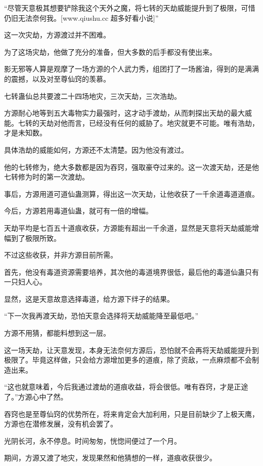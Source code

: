
\begin{this_body}

“尽管天意极其想要铲除我这个天外之魔，将七转的天劫威能提升到了极限，可惜仍旧无法奈何我。[www.qiushu.cc 超多好看小说]”

这一次灾劫，方源渡过并不困难。

为了这场灾劫，他做了充分的准备，但大多数的后手都没有使出来。

影无邪等人算是观摩了一场方源的个人武力秀，组团打了一场酱油，得到的是满满的震撼，以及对至尊仙窍的羡慕。

七转蛊仙总共要渡二十四场地灾，三次天劫，三次浩劫。

方源耐心地等到五大毒物实力最强时，这才动手渡劫，从而刺探出天劫的最大威能。七转的天劫对他而言，已经没有任何的威胁了。地灾就更不可能。唯有浩劫，才是未知数。

具体浩劫的威能如何，方源还不太清楚。因为他没有渡过。

他的七转修为，绝大多数都是因为吞窍，强取豪夺过来的。这一次渡天劫，还是他七转修为时的第一次渡劫。

事后，方源用道可道仙蛊测算，得出这一次天劫，让他收获了一千余道毒道道痕。

今后，方源若用毒道仙蛊，就可有一倍的增幅。

天劫平均是七百五十道痕收获，方源能有超出一千余道，显然是天意将天劫威能增幅到了极限所致。

不过这些收获，并非方源目前所需。

首先，他没有毒道资源需要培养，其次他的毒道境界很低，最后他的毒道仙蛊只有一只妇人心。

显然，这是天意故意选择毒道，给方源下绊子的结果。

“下一次我再渡天劫，恐怕天意会选择将天劫威能降至最低吧。”

方源不用猜，都能料想到这一层。

这一场天劫，让天意发现，本身无法奈何方源后，恐怕就不会再将天劫威能提升到极限了。毕竟这样做，只会给方源增加更多的道痕，除了资敌，一点麻烦都不会制造出来。

“这也就意味着，今后我通过渡劫的道痕收益，将会很低。唯有吞窍，才是正途了。”方源心中了然。

吞窍也是至尊仙窍的优势所在，将来肯定会大加利用，只是目前缺少了上极天鹰，方源也在潜修发展，没有机会罢了。

光阴长河，永不停息。时间匆匆，恍惚间便过了一个月。

期间，方源又渡了地灾，发现果然和他猜想的一样，道痕收获很少。


\end{this_body}
